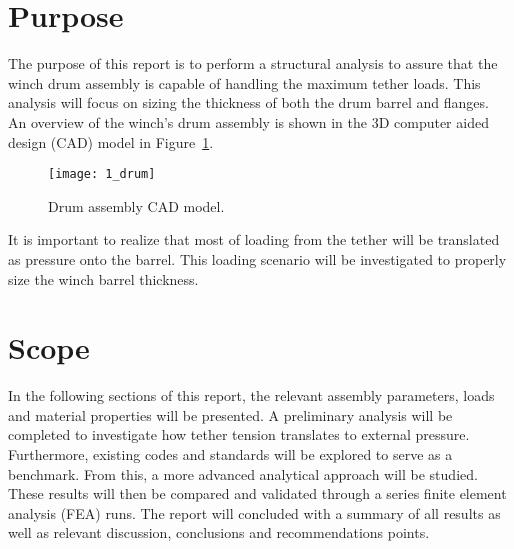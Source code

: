 \section{Purpose}

The purpose of this report is to perform a structural analysis to assure that the winch drum assembly is capable of handling the maximum tether loads. This analysis will focus on sizing the thickness of both the drum barrel and flanges.\\

An overview of the winch's drum assembly is shown in the 3D computer aided design (CAD) model \cite{INVENTOR} in Figure~\ref{fig:1_drum}.
\begin{figure}[H]
	\centering
	\texttt{[image: 1\_drum]}
	\caption{Drum assembly CAD model.}
	\label{fig:1_drum}
\end{figure}

It is important to realize that most of loading from the tether will be translated as pressure onto the barrel. This loading scenario will be investigated to properly size the winch barrel thickness.

\section{Scope}

In the following sections of this report, the relevant assembly parameters, loads and material properties will be presented. A preliminary analysis will be completed to investigate how tether tension translates to external pressure. Furthermore, existing codes and standards will be explored to serve as a benchmark. From this, a more advanced analytical approach will be studied. These results will then be compared and validated through a series finite element analysis (FEA) runs. The report will concluded with a summary of all results as  well as relevant discussion, conclusions and recommendations points.